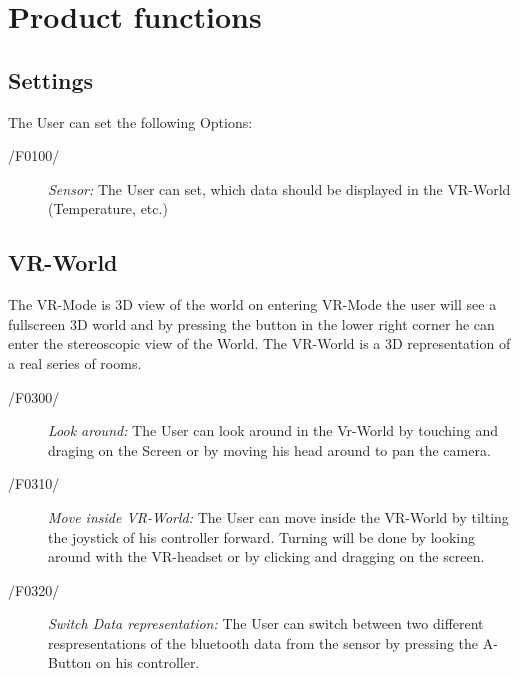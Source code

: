 \section{Product functions}

\subsection{Settings}

The User can set the following Options:
\begin{description}
  \item[/F0100/] 
	\textit{Sensor:} The User can set, which data should be displayed in the VR-World (Temperature, etc.)
\end{description}

\subsection{VR-World}

The VR-Mode is 3D view of the world on entering VR-Mode the user will see a fullscreen 3D world and by pressing the button in the lower right corner he can enter the  stereoscopic view of the World.
The VR-World is a 3D representation of a real series of rooms.
\begin{description}
  \item[/F0300/]
    \textit{Look around:} The User can look around in the Vr-World by touching and draging on the Screen or by moving his head around to pan the camera.
\end{description}

\begin{description}
  \item[/F0310/]

    \textit{Move inside VR-World:} The User can move inside the VR-World by tilting the joystick of his controller forward. Turning will be done by looking around with the VR-headset
                                  or by clicking and dragging on the screen.
\end{description}

\begin{description}
  \item[/F0320/]
    \textit{Switch Data representation:} The User can switch between two different respresentations of the bluetooth data from the sensor by pressing the A-Button on his controller.
\end{description}

